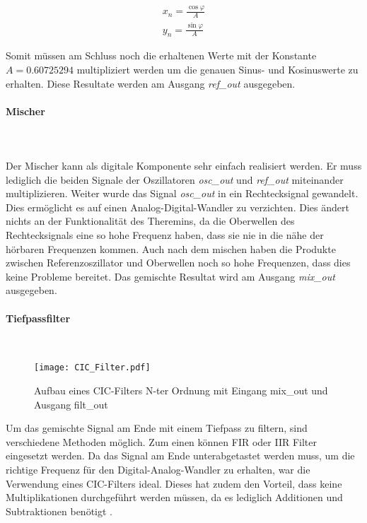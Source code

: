 \begin{equation}
\begin{aligned}
x_n = \frac{\cos{\varphi}}{A} \\
y_n = \frac{\sin{\varphi}}{A}
\end{aligned}
\label{equ:cordic_3}
\end{equation} 

Somit müssen am Schluss noch die erhaltenen Werte mit der Konstante \(A = 0.60725294\) multipliziert werden um die genauen Sinus- und Kosinuswerte zu erhalten. Diese Resultate werden am Ausgang \textit{ref\_out} ausgegeben.



\paragraph{Mischer}\mbox{}\\
\\Der Mischer kann als digitale Komponente sehr einfach realisiert werden. Er muss lediglich die beiden Signale der Oszillatoren \textit{osc\_out} und \textit{ref\_out} miteinander multiplizieren. Weiter wurde das Signal \textit{osc\_out} in ein Rechtecksignal gewandelt. Dies ermöglicht es auf einen Analog-Digital-Wandler zu verzichten. Dies ändert nichts an der Funktionalität des Theremins, da die Oberwellen des Rechtecksignals eine so hohe Frequenz haben, dass sie nie in die nähe der hörbaren Frequenzen kommen. Auch nach dem mischen haben die Produkte zwischen Referenzoszillator und Oberwellen noch so hohe Frequenzen, dass dies keine Probleme bereitet. Das gemischte Resultat wird am Ausgang \textit{mix\_out} ausgegeben.
\clearpage
\paragraph{Tiefpassfilter}\mbox{}\\

\begin{figure}[h]
\centering
\texttt{[image: CIC\_Filter.pdf]}
\caption{Aufbau eines CIC-Filters N-ter Ordnung mit Eingang mix\_out und Ausgang filt\_out}
\label{img:CIC_Filter}
\end{figure}
Um das gemischte Signal am Ende mit einem Tiefpass zu filtern, sind verschiedene Methoden möglich. Zum einen können FIR oder IIR Filter eingesetzt werden. Da das Signal am Ende unterabgetastet werden muss, um die richtige Frequenz für den Digital-Analog-Wandler zu erhalten, war die Verwendung eines CIC-Filters ideal. Dieses hat zudem den Vorteil, dass keine Multiplikationen durchgeführt werden müssen, da es lediglich Additionen und Subtraktionen benötigt \cite{cic_h}.


